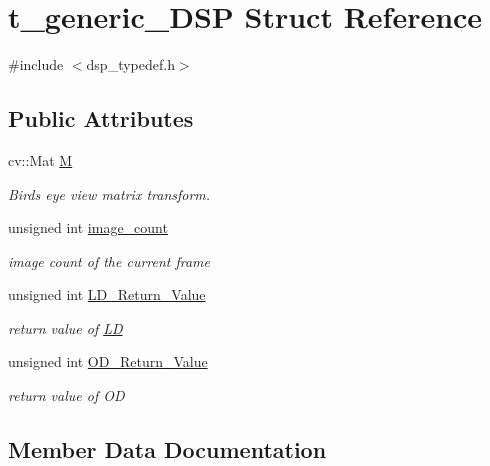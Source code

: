 \hypertarget{structt__generic__DSP}{}\section{t\+\_\+generic\+\_\+\+D\+SP Struct Reference}
\label{structt__generic__DSP}


{\ttfamily \#include $<$dsp\+\_\+typedef.\+h$>$}

\subsection*{Public Attributes}
\begin{DoxyCompactItemize}
\item 
cv\+::\+Mat \hyperlink{structt__generic__DSP_a8b4a706b72a4eba57bf88faf7195e25a}{M}
\begin{DoxyCompactList}\small\item\em Birds eye view matrix transform. \end{DoxyCompactList}\item 
unsigned int \hyperlink{structt__generic__DSP_a4f9e7a07b36c04b34ce3023e87419881}{image\+\_\+count}
\begin{DoxyCompactList}\small\item\em image count of the current frame \end{DoxyCompactList}\item 
unsigned int \hyperlink{structt__generic__DSP_ae4d46f8770a618ec5e7eb5850344a42f}{L\+D\+\_\+\+Return\+\_\+\+Value}
\begin{DoxyCompactList}\small\item\em return value of \hyperlink{namespaceLD}{LD} \end{DoxyCompactList}\item 
unsigned int \hyperlink{structt__generic__DSP_aeb048fc4e3e269765c88686575bdbeab}{O\+D\+\_\+\+Return\+\_\+\+Value}
\begin{DoxyCompactList}\small\item\em return value of OD \end{DoxyCompactList}\end{DoxyCompactItemize}


\subsection{Member Data Documentation}
